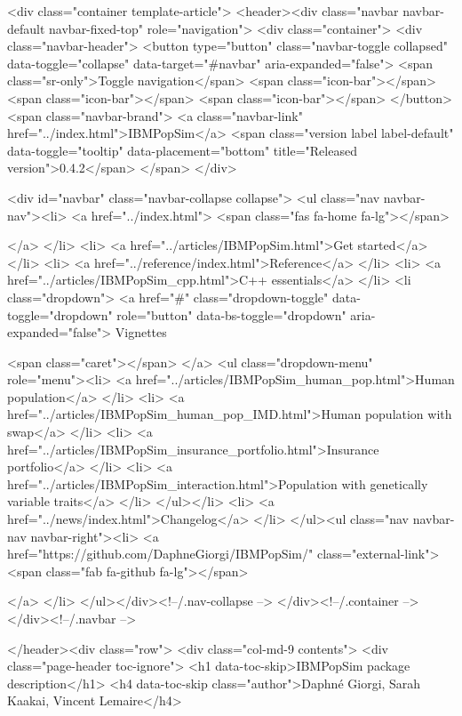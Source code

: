     <div class="container template-article">
      <header><div class="navbar navbar-default navbar-fixed-top" role="navigation">
  <div class="container">
    <div class="navbar-header">
      <button type="button" class="navbar-toggle collapsed" data-toggle="collapse" data-target="#navbar" aria-expanded="false">
        <span class="sr-only">Toggle navigation</span>
        <span class="icon-bar"></span>
        <span class="icon-bar"></span>
        <span class="icon-bar"></span>
      </button>
      <span class="navbar-brand">
        <a class="navbar-link" href="../index.html">IBMPopSim</a>
        <span class="version label label-default" data-toggle="tooltip" data-placement="bottom" title="Released version">0.4.2</span>
      </span>
    </div>

    <div id="navbar" class="navbar-collapse collapse">
      <ul class="nav navbar-nav"><li>
  <a href="../index.html">
    <span class="fas fa-home fa-lg"></span>
     
  </a>
</li>
<li>
  <a href="../articles/IBMPopSim.html">Get started</a>
</li>
<li>
  <a href="../reference/index.html">Reference</a>
</li>
<li>
  <a href="../articles/IBMPopSim_cpp.html">C++ essentials</a>
</li>
<li class="dropdown">
  <a href="#" class="dropdown-toggle" data-toggle="dropdown" role="button" data-bs-toggle="dropdown" aria-expanded="false">
    Vignettes
     
    <span class="caret"></span>
  </a>
  <ul class="dropdown-menu" role="menu"><li>
      <a href="../articles/IBMPopSim_human_pop.html">Human population</a>
    </li>
    <li>
      <a href="../articles/IBMPopSim_human_pop_IMD.html">Human population with swap</a>
    </li>
    <li>
      <a href="../articles/IBMPopSim_insurance_portfolio.html">Insurance portfolio</a>
    </li>
    <li>
      <a href="../articles/IBMPopSim_interaction.html">Population with genetically variable traits</a>
    </li>
  </ul></li>
<li>
  <a href="../news/index.html">Changelog</a>
</li>
      </ul><ul class="nav navbar-nav navbar-right"><li>
  <a href="https://github.com/DaphneGiorgi/IBMPopSim/" class="external-link">
    <span class="fab fa-github fa-lg"></span>
     
  </a>
</li>
      </ul></div><!--/.nav-collapse -->
  </div><!--/.container -->
</div><!--/.navbar -->

      

      </header><div class="row">
  <div class="col-md-9 contents">
    <div class="page-header toc-ignore">
      <h1 data-toc-skip>IBMPopSim package description</h1>
                        <h4 data-toc-skip class="author">Daphné Giorgi, Sarah Kaakai, Vincent Lemaire</h4>
            
